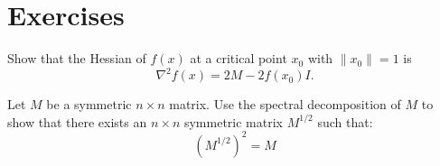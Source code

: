 \section{Exercises}

%
%
%
%


\begin{exercise}
Show that the Hessian of $f(x)$ at a critical point $x_0$ with  $\|x_0\| = 1$ is
$$
\nabla^2 f(x) = 2M - 2 f(x_0) I.
$$
\end{exercise}



\begin{exercise}
Let $M$ be a symmetric $n\times n$ matrix. Use the spectral decomposition of $M$ to show that there exists an $n \times n$ symmetric matrix $M^{1/2}$ such that:
\[
	\left(M^{1/2}\right)^2 = M
\]
\end{exercise}